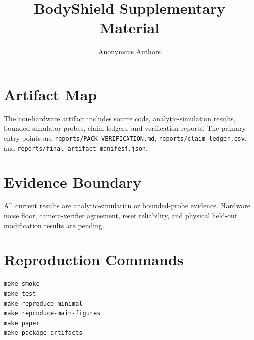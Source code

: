 \documentclass[10pt]{article}
\title{BodyShield Supplementary Material}
\author{Anonymous Authors}
\begin{document}
\maketitle

\section{Artifact Map}
The non-hardware artifact includes source code, analytic-simulation results,
bounded simulator probes, claim ledgers, and verification reports. The primary
entry points are \texttt{reports/PACK_VERIFICATION.md},
\texttt{reports/claim_ledger.csv}, and
\texttt{reports/final_artifact_manifest.json}.

\section{Evidence Boundary}
All current results are analytic-simulation or bounded-probe evidence. Hardware
noise floor, camera-verifier agreement, reset reliability, and physical
held-out modification results are pending.

\section{Reproduction Commands}
\begin{verbatim}
make smoke
make test
make reproduce-minimal
make reproduce-main-figures
make paper
make package-artifacts
\end{verbatim}
\end{document}
